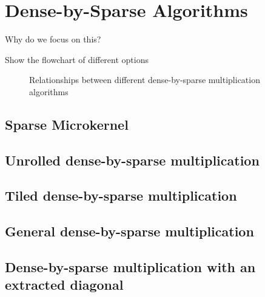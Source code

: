 \chapter{Dense-by-Sparse Algorithms}
\label{chapter:algs}

Why do we focus on this? 

Show the flowchart of different options

\begin{figure}[H]
  \centering
  
  \label{fig:dxspfamilies}
  \caption{Relationships between different dense-by-sparse multiplication algorithms}
\end{figure}


\section{Sparse Microkernel}
\section{Unrolled dense-by-sparse multiplication}
\section{Tiled dense-by-sparse multiplication}
\section{General dense-by-sparse multiplication}
\section{Dense-by-sparse multiplication with an extracted diagonal}
